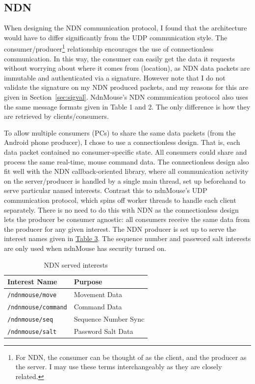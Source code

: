 \documentclass{sig-alternate}
\renewcommand\_{\textunderscore\allowbreak}  %
\begin{document}
\subsection{NDN}
When designing the NDN communication protocol, I found that the architecture would have to differ significantly from the UDP communication style. The consumer/producer\footnote{For NDN, the consumer can be thought of as the client, and the producer as the server. I may use these terms interchangeably as they are closely related.} relationship encourages the use of connectionless communication. In this way, the consumer can easily get the data it requests without worrying about where it comes from (location), as NDN data packets are immutable and authenticated via a signature. However note that I do not validate the signature on my NDN produced packets, and my reasons for this are given in Section~\ref{sec:sigval}. NdnMouse's NDN communication protocol also uses the same message formats given in Table 1 and 2. The only difference is how they are retrieved by clients/consumers.

To allow multiple consumers (PCs) to share the same data packets (from the Android phone producer), I chose to use a connectionless design. That is, each data packet contained no consumer-specific state. All consumers could share and process the same real-time, mouse command data. The connectionless design also fit well with the NDN callback-oriented library, where all communication activity on the server/producer is handled by a single main thread, set up beforehand to serve particular named interests. Contrast this to ndnMouse's UDP communication protocol, which spins off worker threads to handle each client separately. There is no need to do this with NDN as the connectionless design lets the producer be consumer agnostic: all consumers receive the same data from the producer for any given interest. The NDN producer is set up to serve the interest names given in \hyperlink{tab:ndnInterestNames}{Table 3}. The sequence number and password salt interests are only used when ndnMouse has security turned on.

\begin{table}
	\hypertarget{tab:ndnInterestNames}{}
	\begin{center}
		\begin{tabular}{| l | l |}
			\hline
			 Interest Name & Purpose \\ \hline\hline
			\texttt{/ndnmouse/move} & Movement Data\\ \hline
			\texttt{/ndnmouse/command} & Command Data\\ \hline
			\texttt{/ndnmouse/seq} & Sequence Number Sync\\ \hline
			\texttt{/ndnmouse/salt} & Password Salt Data\\ \hline
		\end{tabular}
		\caption{NDN served interests}
	\end{center}
\end{table}
\end{document}
